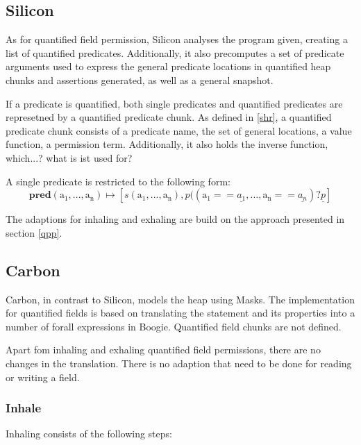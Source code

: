 \documentclass[12pt]{article}
\begin{document}
\subsection{Silicon}

As for quantified field permission, Silicon analyses the program given, creating a list of quantified predicates. Additionally, it also precomputes a set of predicate arguments used to express the general predicate locations in quantified heap chunks and assertions generated, as well as a general snapshot.

If a predicate is quantified, both single predicates and quantified predicates are represetned by a quantified predicate chunk. As defined in \ref{shr}, a quantified predicate chunk consists of a predicate name, the set of general locations, a value function, a permission term. Additionally, it also holds the inverse function, which...? what is ist used for?

A single predicate is restricted to the following form:\\

\begin{equation}
	\mathbf{pred}(\mathrm{a_1, ..., a_n})\mapsto [s(\mathrm{a_1, ..., a_n}), p((\mathrm{a_1} == \underline{a_1}, \dots, \mathrm{a_n} == \underline{a_n}) ? \underline{p}]
\end{equation}

The adaptions for inhaling and exhaling are build on the approach presented in section \ref{qpp}.


\subsection{Carbon}
Carbon, in contrast to Silicon, models the heap using Masks. The implementation for quantified fields is based on translating the statement and its properties into a number of forall expressions in Boogie. Quantified field chunks are not defined.

Apart fom inhaling and exhaling quantified field permissions, there are no changes in the translation. There is no adaption that need to be done for reading or writing a field.

\subsubsection{Inhale}
Inhaling consists of the following steps:
\end{document}
